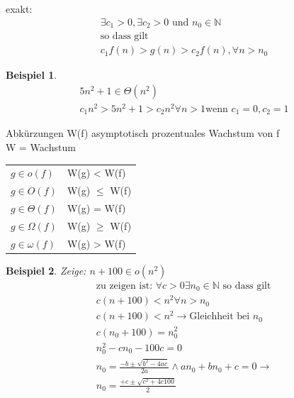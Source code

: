 \documentclass[a4paper,10pt]{report}
\newtheorem{myexample}{Beispiel}
\newcommand{\N}{{\mathbb N}}
\begin{document}
exakt:
\begin{eqnarray*}
	\exists c_1 > 0, \exists c_2 > 0 \text{ und } n_0 \in \N\\
	\text{so dass gilt}\\
	c_1f(n) > g(n) > c_2 f(n), \forall n > n_0
\end{eqnarray*}
\begin{myexample}
	\begin{eqnarray*}
		5n^2 + 1 \in \Theta(n^2)\\
		c_1n^2 > 5n^2 +1 > c_2n^2 \forall n > 1
		\text{wenn } c_1 = 0, c_2 = 1
	\end{eqnarray*}
\end{myexample}
\newpage
\noindent
Abkürzungen W(f) asymptotisch prozentuales Wachstum von f\\
W = Wachstum\\

\begin{tabularx}{\textwidth}{l|l}
	$g \in o(f)$ & W(g) < W(f)\\
	$g \in O(f)$ & W(g) $\leq$ W(f)\\
	$g \in \Theta(f)$ & W(g) = W(f)\\
	$g \in \Omega(f)$ & W(g) $\geq$ W(f)\\
	$g \in \omega(f)$ & W(g) > W(f)
\end{tabularx}
\begin{myexample}
	Zeige: $n+100 \in o(n^2)$
	\begin{eqnarray*}	
		\text{zu zeigen ist: } \forall c > 0 \exists n_0 \in \N \text{ so dass gilt}\\
		c(n+100) < n^2 \forall n > n_0\\
		c(n+100) < n^2 \to \text{Gleichheit bei $n_0$}	\\
		c(n_0+100) = n_0^2\\
		n_0^2 - cn_0 -100c = 0\\
		n_0 = \frac{-b \pm \sqrt{b^2-4ac}}{2a} \land an_0+bn_0+ c = 0 \to\\
		n_0 = \frac{+ c \pm \sqrt{c^2 + 4c100}}{2}\\
	\end{eqnarray*}
\end{myexample}
\newpage
\end{document}
